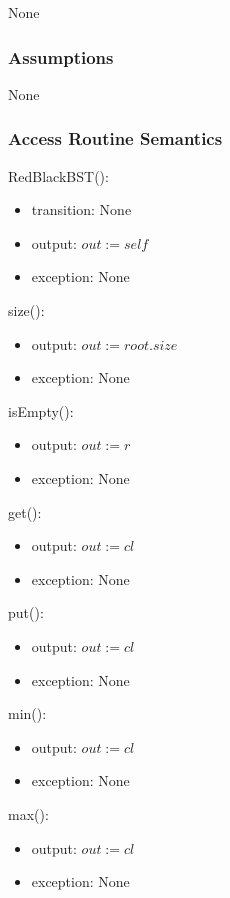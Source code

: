 \documentclass[12pt]{article}
\begin{document}
None

\subsubsection* {Assumptions}

None

\subsubsection* {Access Routine Semantics}

RedBlackBST():
\begin{itemize}
\item transition: None
\item output: $out := \mathit{self}$
\item exception: None
\end{itemize}

\noindent size():
\begin{itemize}
\item output: $out := root.size$
\item exception: None
\end{itemize}

\noindent isEmpty():
\begin{itemize}
\item output: $out := r$
\item exception: None
\end{itemize}

\noindent get():
\begin{itemize}
\item output: $out := cl$
\item exception: None
\end{itemize}

\noindent put():
\begin{itemize}
\item output: $out := cl$
\item exception: None
\end{itemize}

\noindent min():
\begin{itemize}
\item output: $out := cl$
\item exception: None
\end{itemize}

\noindent max():
\begin{itemize}
\item output: $out := cl$
\item exception: None
\end{itemize}
\end{document}
